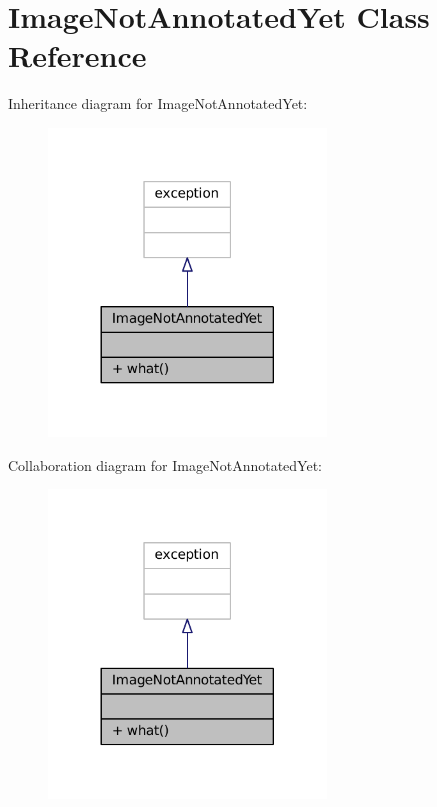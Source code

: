 \hypertarget{classImageNotAnnotatedYet}{}\section{Image\+Not\+Annotated\+Yet Class Reference}
\label{classImageNotAnnotatedYet}


Inheritance diagram for Image\+Not\+Annotated\+Yet\+:
\nopagebreak
\begin{figure}[H]
\begin{center}
\leavevmode
\includegraphics[width=209pt]{classImageNotAnnotatedYet__inherit__graph}
\end{center}
\end{figure}


Collaboration diagram for Image\+Not\+Annotated\+Yet\+:
\nopagebreak
\begin{figure}[H]
\begin{center}
\leavevmode
\includegraphics[width=209pt]{classImageNotAnnotatedYet__coll__graph}
\end{center}
\end{figure}
